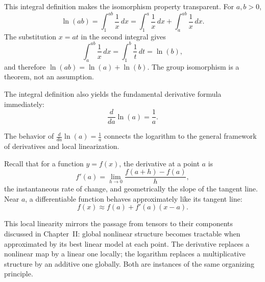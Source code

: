 \medskip

This integral definition makes the isomorphism property transparent.
For $a,b>0$,
\[
\ln(ab)
=\int_1^{ab}\frac{1}{x}\,dx
=\int_1^{a}\frac{1}{x}\,dx+\int_a^{ab}\frac{1}{x}\,dx.
\]
The substitution $x=at$ in the second integral gives
\[
\int_a^{ab}\frac{1}{x}\,dx=\int_1^{b}\frac{1}{t}\,dt=\ln(b),
\]
and therefore $\ln(ab)=\ln(a)+\ln(b)$.
The group isomorphism is a theorem, not an assumption.

\medskip

The integral definition also yields the fundamental derivative formula immediately:
\[
\frac{d}{da}\ln(a)=\frac{1}{a}.
\]


\medskip

The behavior of $\frac{d}{da}\ln(a) = \frac{1}{a}$ connects the logarithm to
the general framework of derivatives and local linearization.

\medskip

Recall that for a function $y = f(x)$, the derivative at a point $a$ is
\[
f'(a) = \lim_{h\to0}\frac{f(a+h)-f(a)}{h},
\]
the instantaneous rate of change, and geometrically the slope of the tangent line.
Near $a$, a differentiable function behaves approximately like its tangent line:
\[
f(x) \approx f(a) + f'(a)(x-a).
\]

\medskip

This local linearity mirrors the passage from tensors to their components
discussed in Chapter~II: global nonlinear structure becomes tractable when
approximated by its best linear model at each point.
The derivative replaces a nonlinear map by a linear one locally;
the logarithm replaces a multiplicative structure by an additive one globally.
Both are instances of the same organizing principle.


